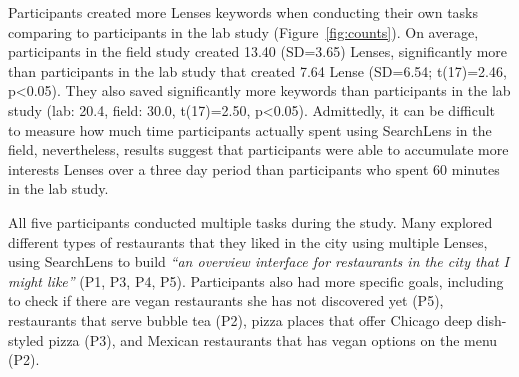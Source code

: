 \documentclass{sigchi}
\begin{document}

Participants created more Lenses keywords when conducting their own tasks comparing to participants in the lab study (Figure~\ref{fig:counts}). On average, participants in the field study created 13.40 (SD=3.65) Lenses, significantly more than participants in the lab study that created 7.64 Lense (SD=6.54; t(17)=2.46, p<0.05). They also saved significantly more keywords than participants in the lab study (lab: 20.4, field: 30.0, t(17)=2.50, p<0.05).
Admittedly, it can be difficult to measure how much time participants actually spent using SearchLens in the field, nevertheless, results suggest that participants were able to accumulate more interests Lenses over a three day period than participants who spent 60 minutes in the lab study.

All five participants conducted multiple tasks during the study. Many explored different types of restaurants that they liked in the city using multiple Lenses, using SearchLens to build \emph{``an overview interface for restaurants in the city that I might like''} (P1, P3, P4, P5). Participants also had more specific goals, including to check if there are vegan restaurants she has not discovered yet (P5), restaurants that serve bubble tea (P2), pizza places that offer Chicago deep dish-styled pizza (P3), and Mexican restaurants that has vegan options on the menu (P2).




%    
\end{document}
